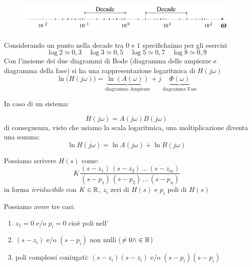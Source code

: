 \begin{figure}[H]
	\centering
	\includegraphics[width=0.7\linewidth]{immagini/cap6_Bode/decade.pdf}
	\label{fig:schDecade}
\end{figure}
Considerando un punto nella decade tra $ 0 $ e $ 1 $ specifichaimo per gli esercizi
\[ 
	\log 2 \simeq 0,3 \quad \log 3 \simeq 0,5 \quad\log 5 \simeq 0,7 \quad\log 8 \simeq 0,9 
 \]
Con l'insieme dei due diagrammi di Bode (diagramma delle ampiezze e diagramma della fase) si ha una rappresentazione logaritmica di $ H(j\omega) $
\[ 
	\ln \big(H(j\omega)\big) = \underbrace{\ln (A(\omega))}_{\text{diagramma Ampiezze}} + j\,\underbrace{\Phi (\omega)}_{\text{diagramma Fase}}
 \]
 
 In caso di un sistema:
\begin{center}
	
\end{center}

\[ 
	H(j \omega)=A(j \omega)B(j \omega)
 \]
 di conseguenza, visto che usiamo la scala logaritmica, una moltiplicazione diventa una somma: 
 \[ 
	\ln H(j \omega)=\ln A(j \omega) + \ln B(j \omega)
 \]
 
 
 
 Possiamo scrivere $ H(s) $ come:
 \[  
 	K \, \frac{(s-z_1)\,(s-z_2)\,\dots \,(s-z_m)}{(s-p_1)\,(s-p_2)\,\dots \,(s-p_n)}
 \]
 in forma \emph{irriducibile} con $K \in \mathbb{R}  $, $ z_i $ zeri di $ H(s) $ e $ p_i $ poli di $ H(s) $
 
 Possiamo avere tre casi:
 \begin{enumerate}
 	\item $ z_1=0 $ e/o $ p_i = 0 $ cioè poli nell' 
 	\item $ (s-z_i) $ e/o $ (s-p_i) $ non nulli ($ \ne 0  \wedge \in \mathbb{R}$)
 	\item poli complessi coniugati: $ (s-z_i)(s-\overline{z_i}) $ e/o  $ (s-p_i)(s-\overline{p_i}) $
 \end{enumerate}

